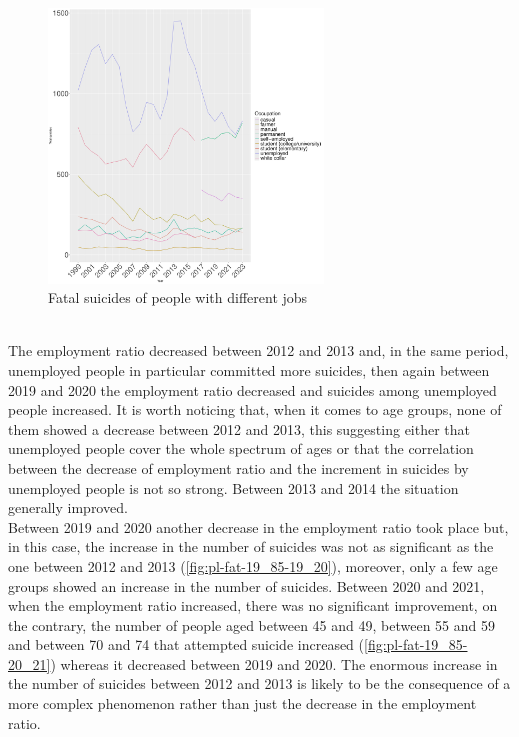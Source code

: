 \documentclass{article}
\begin{document}
\begin{figure}[H]
	\centering
	\includegraphics[width=0.65\textwidth]{imgs/pl-fat-job-1999.pdf}
	\caption{Fatal suicides of people with different jobs}
	\label{fig:pl-fat-job-1999}
\end{figure}
%
\hfill \\
%
The employment ratio decreased between 2012 and 2013 and, in the same period,
unemployed people in particular committed more suicides, then again between 2019 and 2020 
the employment ratio decreased and suicides among unemployed people increased.
%
It is worth noticing that, when it comes to age groups, none of them showed a decrease between 
2012 and 2013, this suggesting either that unemployed people cover the whole spectrum of ages
or that the correlation between the decrease of employment ratio and the increment in suicides by
unemployed people is not so strong.
Between 2013 and 2014 the situation generally improved. \\
Between 2019 and 2020 another decrease in the employment ratio took place but, in this
case, the increase in the number of suicides was not as significant as the one between 2012 and 2013
(\ref{fig:pl-fat-19_85-19_20}),
moreover, only a few age groups showed an increase in the number of suicides. 
Between 2020 and 2021, when the employment ratio increased, there was no significant improvement,
on the contrary, the number of people aged between 45 and 49, between 55 and 59 and between 70 and 74
that attempted suicide
increased (\ref{fig:pl-fat-19_85-20_21}) whereas it decreased between 2019 and 2020.
The enormous increase in the number of suicides between 2012 and 2013 is likely to be the consequence 
of a more complex phenomenon rather than just the decrease in the employment ratio.
\end{document}
